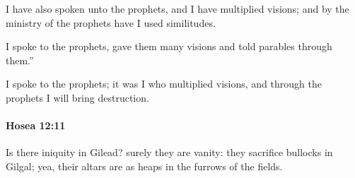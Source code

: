 			\begin{versebox}
					\item[BHS] 
					\item[LXX] 
					\item[ASV] I have also spoken unto the prophets, and I have multiplied visions; and by the ministry of the prophets have I used similitudes.
					\item[NIV] I spoke to the prophets, gave them many visions and told parables through them.”
					\item[NRSV] I spoke to the prophets; it was I who multiplied visions, and through the prophets I will bring destruction.
			\end{versebox}

		\paragraph{Hosea 12:11} %
			\label{HOSEA-12-11}

			Is there iniquity in Gilead? surely they are vanity: they sacrifice bullocks in Gilgal; yea, their altars are as heaps in the furrows of the fields.

